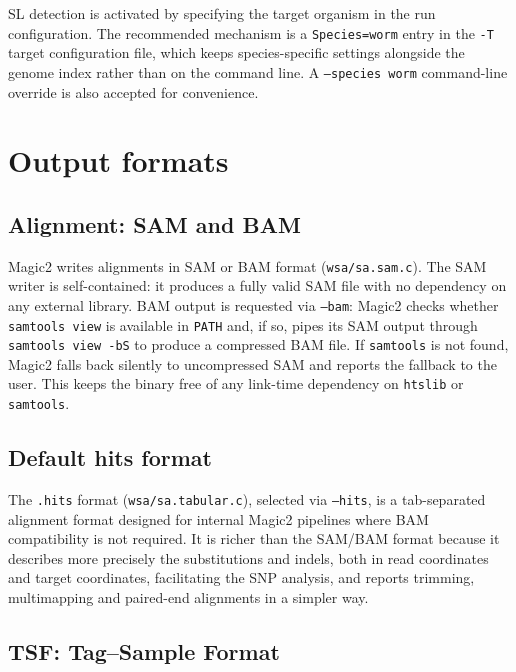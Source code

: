 \documentclass[11pt]{article}
\begin{document}
SL detection is activated by specifying the target organism in the
run configuration.
The recommended mechanism is a \texttt{Species=worm} entry in the
\texttt{-T} target configuration file, which keeps species-specific
settings alongside the genome index rather than on the command line.
A \texttt{--species worm} command-line override is also accepted for
convenience.

\section{Output formats}
\label{sec:outputs}

\subsection{Alignment: SAM and BAM}
\label{sec:sambam}

Magic2 writes alignments in SAM or BAM format (\texttt{wsa/sa.sam.c}).
The SAM writer is self-contained: it produces a fully valid SAM file
with no dependency on any external library.
BAM output is requested via \texttt{--bam}: Magic2 checks whether
\texttt{samtools view} is available in \texttt{PATH} and, if so,
pipes its SAM output through \texttt{samtools view -bS} to produce
a compressed BAM file.
If \texttt{samtools} is not found, Magic2 falls back silently to
uncompressed SAM and reports the fallback to the user.
This keeps the binary free of any link-time dependency on
\texttt{htslib} or \texttt{samtools}.

\subsection{Default hits format}
\label{sec:hits}

The \texttt{.hits} format (\texttt{wsa/sa.tabular.c}), selected via
\texttt{--hits}, is a tab-separated alignment format designed
for internal Magic2 pipelines where BAM compatibility is not required.
It is richer than the SAM/BAM format because it describes more precisely
the substitutions and indels, both in read coordinates and target
coordinates, facilitating the SNP analysis, and reports trimming,
multimapping and paired-end alignments in a simpler way.

\subsection{TSF: Tag--Sample Format}
\label{sec:tsf}
\end{document}
